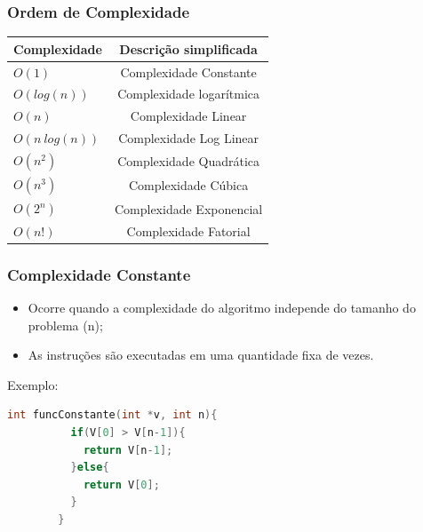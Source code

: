 \documentclass[10pt]{beamer}
\begin{document}
\begin{frame}
    \begin{center}
        \frametitle{Ordem de Complexidade}
        \begin{tabular}{l|c}
            \textbf{Complexidade} & \textbf{Descrição simplificada} \\[5pt]
            \hline
            \pause $O(1)$         & Complexidade Constante          \\[5pt]
            \pause $O(log(n))$    & Complexidade logarítmica        \\[5pt]
            \pause $O(n)$         & Complexidade Linear             \\[5pt]
            \pause $O(n\ log(n))$ & Complexidade Log Linear         \\[5pt]
            \pause $O(n^2)$       & Complexidade Quadrática         \\[5pt]
            \pause $O(n^3)$       & Complexidade Cúbica             \\[5pt]
            \pause $O(2^n)$       & Complexidade Exponencial        \\[5pt]
            \pause $O(n!)$        & Complexidade Fatorial           \\[5pt]
        \end{tabular}
    \end{center}
\end{frame}


\begin{frame}[fragile, t]
    \frametitle{Complexidade Constante}
    \begin{itemize}
        \item Ocorre quando a complexidade do algoritmo independe do tamanho do problema (n);
        \item As instruções são executadas em uma quantidade fixa de vezes.
    \end{itemize}
    \pause Exemplo:
    \begin{lstlisting}[language=C++, basicstyle=\small]
        int funcConstante(int *v, int n){ 
          if(V[0] > V[n-1]){
            return V[n-1];
          }else{
            return V[0];
          }
        } 
    \end{lstlisting}

\end{frame}
\end{document}
